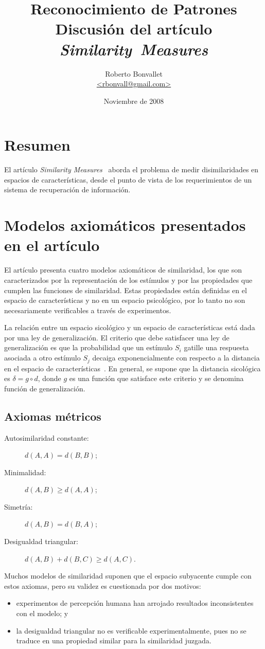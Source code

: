 \documentclass[spanish]{article}
\title{Reconocimiento de Patrones\\Discusión del artículo \textit{Similarity~Measures}}
\author{Roberto Bonvallet \\ \url {<rbonvall@gmail.com>}}
\date{Noviembre de 2008}
\begin{document}
\maketitle

\section{Resumen}
El artículo \textit{Similarity Measures}~\cite{sim} aborda el problema de medir
disimilaridades en espacios de características, desde el punto de vista de los
requerimientos de un sistema de recuperación de información.


\section{Modelos axiomáticos presentados en el artículo}
El artículo presenta cuatro modelos axiomáticos de similaridad, los que son caracterizados por 
la representación de los estímulos y por las propiedades que cumplen las funciones de similaridad.
Estas propiedades están definidas en el espacio de características y no en un espacio psicológico,
por lo tanto no son necesariamente verificables a través de experimentos.

La relación entre un espacio sicológico y un espacio de características está dada por una ley de
generalización.  El criterio que debe satisfacer una ley de generalización es que la probabilidad
que un estímulo $S_i$ gatille una respuesta asociada a otro estímulo $S_j$ decaiga exponencialmente
con respecto a la distancia en el espacio de características~\cite{shepard}.  En general, se supone
que la distancia sicológica es $\delta = g\circ d$, donde $g$ es una función que satisface este
criterio y se denomina función de generalización.

\subsection{Axiomas métricos}

\begin{description}
    \item [Autosimilaridad constante:]
        $d(A, A) = d(B, B)$;
    \item [Minimalidad:]
        $d(A, B)\ge d(A, A)$;
    \item [Simetría:]
        $d(A, B) = d(B, A)$;
    \item [Desigualdad triangular:]
        $d(A, B) + d(B, C)\ge d(A, C)$.
\end{description}
Muchos modelos de similaridad suponen que el espacio subyacente cumple con estos axiomas,
pero su validez es cuestionada por dos motivos:
\begin{itemize}
    \item experimentos de percepción humana han arrojado resultados
        inconsistentes con el modelo; y
    \item la desigualdad triangular no es verificable experimentalmente,
        pues no se traduce en una propiedad similar para la similaridad juzgada.
\end{itemize}
\end{document}
